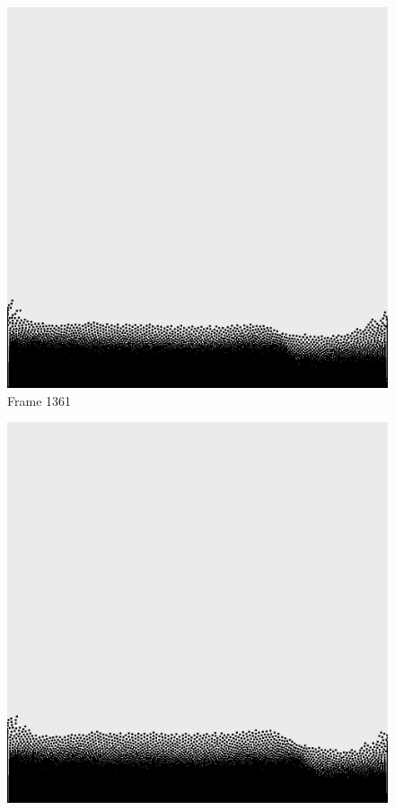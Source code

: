 \documentclass[a4paper, 12pt, oneside]{book}
\begin{document}
\begin{figure}[!ht]
    \addvspace{0.5ex}
        \begin{center}
            \includegraphics[width=\linewidth]{images/test_case_2/1361.png}
            Frame 1361
        \end{center}
    \endminipage
    \hfill
        \begin{center}
            \includegraphics[width=\linewidth]{images/test_case_2/1381.png}

\end{center}
\end{figure}
\end{document}
